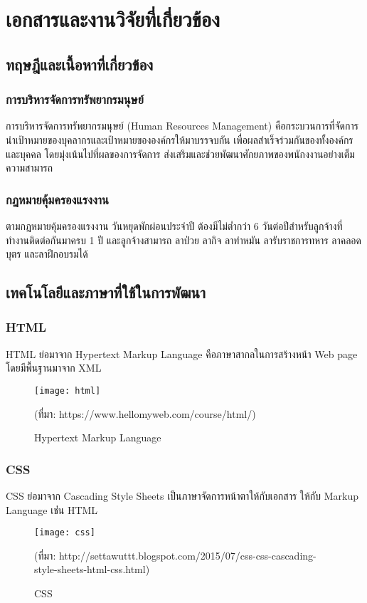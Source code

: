\chapter{เอกสารและงานวิจัยที่เกี่ยวข้อง}
\label{chapter:related-theory}

\section{ทฤษฎีและเนื้อหาที่เกี่ยวข้อง}
\subsection{การบริหารจัดการทรัพยากรมนุษย์}
การบริหารจัดการทรัพยากรมนุษย์ (Human Resources Management) คือกระบวนการที่จัดการนำเป้าหมายของบุคลากรและเป้าหมายขององค์กรให้มาบรรจบกัน เพื่อผลสำเร็จร่วมกันของทั้งองค์กรและบุคคล โดยมุ่งเน้นไปที่ผลของการจัดการ ส่งเสริมและช่วยพัฒนาศักยภาพของพนักงงานอย่างเต็มความสามารถ
\subsection{กฎหมายคุ้มครองแรงงาน}
ตามกฎหมายคุ้มครองแรงงาน วันหยุดพักผ่อนประจำปี ต้องมีไม่ต่ำกว่า 6 วันต่อปีสำหรับลูกจ้างที่ทำงานติดต่อกันมาครบ 1 ปี และลูกจ้างสามารถ ลาป่วย ลากิจ ลาทำหมัน ลารับราชการทหาร ลาคลอดบุตร และลาฝึกอบรมได้

\section{เทคโนโลยีและภาษาที่ใช้ในการพัฒนา}
\subsection{HTML}
HTML ย่อมาจาก Hypertext Markup Language  คือภาษาสากลในการสร้างหน้า Web page โดยมีพื้นฐานมาจาก XML
\begin{figure}[!h]
	\centering
	\texttt{[image: html]}
	\caption{Hypertext Markup Language}
	(ที่มา: https://www.hellomyweb.com/course/html/)
	\label{Fig:HTML}
\end{figure}
\newpage
\subsection{CSS}
CSS ย่อมาจาก Cascading Style Sheets เป็นภาษาจัดการหน้าตาให้กับเอกสาร ให้กับ Markup Language เช่่น HTML
\begin{figure}[!h]
	\centering
	\texttt{[image: css]}
	\caption{CSS}
	(ที่มา: http://settawuttt.blogspot.com/2015/07/css-css-cascading-style-sheets-html-css.html)
	\label{Fig:CSS}
\end{figure}

